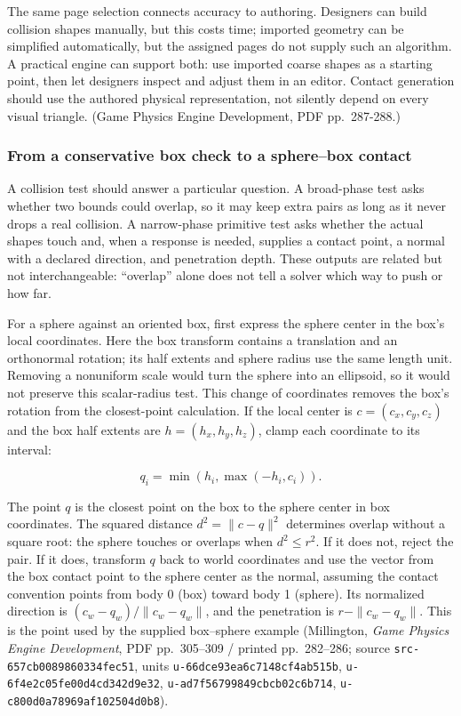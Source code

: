 The same page selection connects accuracy to authoring. Designers can build collision shapes manually, but this costs time; imported geometry can be simplified automatically, but the assigned pages do not supply such an algorithm. A practical engine can support both: use imported coarse shapes as a starting point, then let designers inspect and adjust them in an editor. Contact generation should use the authored physical representation, not silently depend on every visual triangle. (Game Physics Engine Development, PDF pp.~287-288.)

\subsubsection{From a conservative box check to a sphere--box contact}\label{from-a-conservative-box-check-to-a-spherebox-contact}

A collision test should answer a particular question. A broad-phase test asks whether two bounds could overlap, so it may keep extra pairs as long as it never drops a real collision. A narrow-phase primitive test asks whether the actual shapes touch and, when a response is needed, supplies a contact point, a normal with a declared direction, and penetration depth. These outputs are related but not interchangeable: ``overlap'' alone does not tell a solver which way to push or how far.

For a sphere against an oriented box, first express the sphere center in the box's local coordinates. Here the box transform contains a translation and an orthonormal rotation; its half extents and sphere radius use the same length unit. Removing a nonuniform scale would turn the sphere into an ellipsoid, so it would not preserve this scalar-radius test. This change of coordinates removes the box's rotation from the closest-point calculation. If the local center is \(c=(c_x,c_y,c_z)\) and the box half extents are \(h=(h_x,h_y,h_z)\), clamp each coordinate to its interval:

\[
q_i=\min(h_i,\max(-h_i,c_i)).
\]

The point \(q\) is the closest point on the box to the sphere center in box coordinates. The squared distance \(d^2=\|c-q\|^2\) determines overlap without a square root: the sphere touches or overlaps when \(d^2\le r^2\). If it does not, reject the pair. If it does, transform \(q\) back to world coordinates and use the vector from the box contact point to the sphere center as the normal, assuming the contact convention points from body 0 (box) toward body 1 (sphere). Its normalized direction is \((c_w-q_w)/\|c_w-q_w\|\), and the penetration is \(r-\|c_w-q_w\|\). This is the point used by the supplied box--sphere example (Millington, \emph{Game Physics Engine Development}, PDF pp.~305--309 / printed pp.~282--286; source \texttt{src-657cb0089860334fec51}, units \texttt{u-66dce93ea6c7148cf4ab515b}, \texttt{u-6f4e2c05fe00d4cd342d9e32}, \texttt{u-ad7f56799849cbcb02c6b714}, \texttt{u-c800d0a78969af102504d0b8}).

